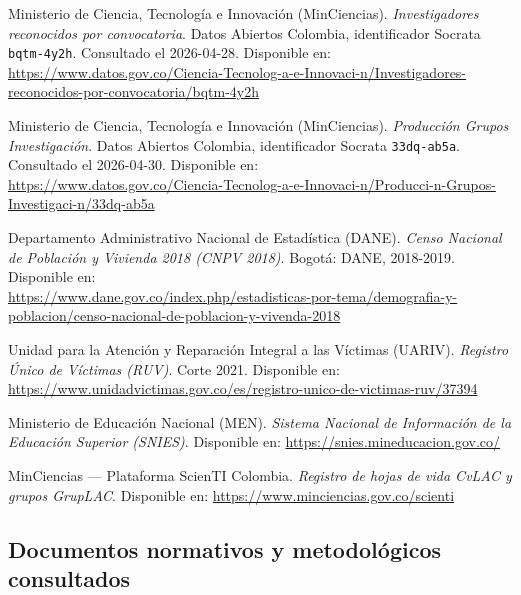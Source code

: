 \documentclass[11pt,a4paper,oneside]{article}
\begin{document}
\begin{enumerate}[label={[}\arabic*{]},leftmargin=2.2em,itemsep=4pt]
\item Ministerio de Ciencia, Tecnología e Innovación (MinCiencias). \emph{Investigadores reconocidos por convocatoria}. Datos Abiertos Colombia, identificador Socrata \texttt{bqtm-4y2h}. Consultado el 2026-04-28. Disponible en: \\
\url{https://www.datos.gov.co/Ciencia-Tecnolog-a-e-Innovaci-n/Investigadores-reconocidos-por-convocatoria/bqtm-4y2h}

\item Ministerio de Ciencia, Tecnología e Innovación (MinCiencias). \emph{Producción Grupos Investigación}. Datos Abiertos Colombia, identificador Socrata \texttt{33dq-ab5a}. Consultado el 2026-04-30. Disponible en: \\
\url{https://www.datos.gov.co/Ciencia-Tecnolog-a-e-Innovaci-n/Producci-n-Grupos-Investigaci-n/33dq-ab5a}

\item Departamento Administrativo Nacional de Estadística (DANE). \emph{Censo Nacional de Población y Vivienda 2018 (CNPV 2018)}. Bogotá: DANE, 2018-2019. Disponible en: \\
\url{https://www.dane.gov.co/index.php/estadisticas-por-tema/demografia-y-poblacion/censo-nacional-de-poblacion-y-vivenda-2018}

\item Unidad para la Atención y Reparación Integral a las Víctimas (UARIV). \emph{Registro Único de Víctimas (RUV)}. Corte 2021. Disponible en: \\
\url{https://www.unidadvictimas.gov.co/es/registro-unico-de-victimas-ruv/37394}

\item Ministerio de Educación Nacional (MEN). \emph{Sistema Nacional de Información de la Educación Superior (SNIES)}. Disponible en: \url{https://snies.mineducacion.gov.co/}

\item MinCiencias --- Plataforma ScienTI Colombia. \emph{Registro de hojas de vida CvLAC y grupos GrupLAC}. Disponible en: \url{https://www.minciencias.gov.co/scienti}
\end{enumerate}

\subsection*{Documentos normativos y metodológicos consultados}
\end{document}
